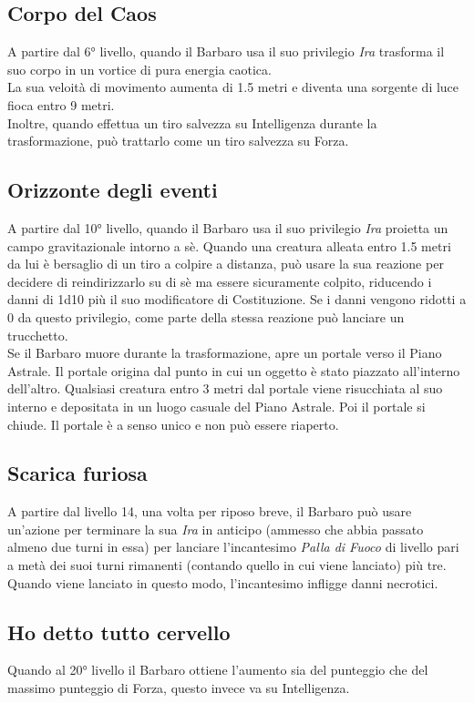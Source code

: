 \subsection{Corpo del Caos}
A partire dal 6° livello, quando il Barbaro usa il suo privilegio \textit{Ira} trasforma il suo corpo in un vortice di pura energia caotica.\\
La sua veloità di movimento aumenta di 1.5 metri e diventa una sorgente di luce fioca entro 9 metri.\\
Inoltre, quando effettua un tiro salvezza su Intelligenza durante la trasformazione, può trattarlo come un tiro salvezza su Forza.

\subsection{Orizzonte degli eventi}
A partire dal 10° livello, quando il Barbaro usa il suo privilegio \textit{Ira} proietta un campo gravitazionale intorno a sè. Quando una creatura alleata entro 1.5 metri da lui è bersaglio di un tiro a colpire a distanza, può usare la sua reazione per decidere di reindirizzarlo su di sè ma essere sicuramente colpito, riducendo i danni di 1d10 più il suo modificatore di Costituzione. Se i danni vengono ridotti a 0 da questo privilegio, come parte della stessa reazione può lanciare un trucchetto.\\
Se il Barbaro muore durante la trasformazione, apre un portale verso il Piano Astrale. Il portale origina dal punto in cui un oggetto è stato piazzato all'interno dell'altro. Qualsiasi creatura entro 3 metri dal portale viene risucchiata al suo interno e depositata in un luogo casuale del Piano Astrale. Poi il portale si chiude. Il portale è a senso unico e non può essere riaperto.

\subsection{Scarica furiosa}
A partire dal livello 14, una volta per riposo breve, il Barbaro può usare un'azione per terminare la sua \textit{Ira} in anticipo (ammesso che abbia passato almeno due turni in essa) per lanciare l'incantesimo \textit{Palla di Fuoco} di livello pari a metà dei suoi turni rimanenti (contando quello in cui viene lanciato) più tre. Quando viene lanciato in questo modo, l'incantesimo infligge danni necrotici.

\subsection{Ho detto tutto cervello}
Quando al 20° livello il Barbaro ottiene l'aumento sia del punteggio che del massimo punteggio di Forza, questo invece va su Intelligenza.